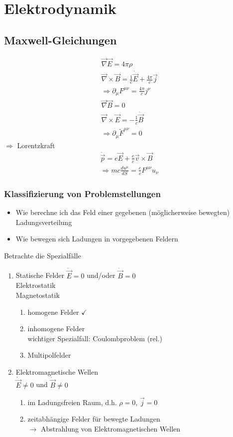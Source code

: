 \documentclass[a4paper]{article}
\begin{document}
\section{Elektrodynamik}
\subsection{Maxwell-Gleichungen}
\begin{align}
\vec{\nabla}\vec{E}=4\pi\rho\\
\vec{\nabla}\times\vec{B}=\frac{1}{c}\dot{\vec{E}}+\frac{4\pi}{c}\vec{j}\\
\Rightarrow \partial_\mu F^{\mu\nu}=\frac{4\pi}{c}j^\nu\\
\vec{\nabla}\vec{B}=0\\
\vec{\nabla}\times\vec{E}=-\frac{1}{c}\dot{\vec{B}}\\
\Rightarrow \partial_\mu \tilde{F}^{\mu\nu}=0
\end{align}
$\Rightarrow$ Lorentzkraft
\begin{align}
\dot{\vec{p}}=e\vec{E}+\frac{e}{c}\vec{v}\times\vec{B}\\
\Rightarrow mc\frac{du^\mu}{dS}=\frac{e}{c}F^{\mu\nu}u_\nu
\end{align}
\subsubsection{Klassifizierung von Problemstellungen}
\begin{itemize}
  \item Wie berechne ich das Feld einer gegebenen (möglicherweise bewegten)
  Ladungsverteilung
  \item Wie bewegen sich Ladungen in vorgegebenen Feldern
\end{itemize}
Betrachte die Spezialfälle
\begin{enumerate}
  \item Statische Felder $\dot{\vec{E}}=0$ und/oder $\dot{\vec{B}}=0$\\
  Elektrostatik \\ Magnetostatik
\begin{enumerate}
  \item homogene Felder $\checkmark$
  \item inhomogene Felder \\ wichtiger Spezialfall: Coulombproblem (rel.)
  \item Multipolfelder 
\end{enumerate}
  \item Elektromagnetische Wellen \\ $\dot{\vec{E}}\neq0$ und
  $\dot{\vec{B}}\neq0$
  \begin{enumerate}
  \item im Ladungsfreien Raum, d.h. $\rho=0$, $\vec{j}=0$
  \item zeitabhängige Felder für bewegte Ladungen \\ $\rightarrow$ Abstrahlung
  von Elektromagnetischen Wellen
\end{enumerate}
\end{enumerate}
\end{document}
